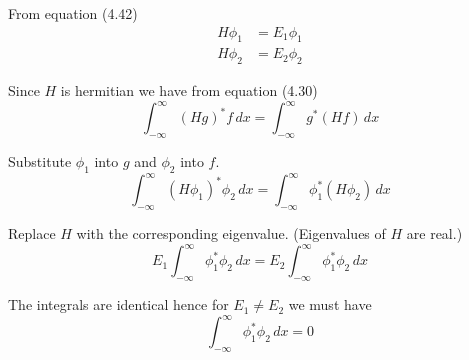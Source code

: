 


\bigskip
From equation (4.42)
\begin{align*}
H\phi_1&=E_1\phi_1
\\
H\phi_2&=E_2\phi_2
\end{align*}

Since $H$ is hermitian we have from equation (4.30)
\begin{equation*}
\int_{-\infty}^\infty(Hg)^*f\,dx=\int_{-\infty}^\infty g^*(Hf)\,dx
\tag{4.30}
\end{equation*}

Substitute $\phi_1$ into $g$ and $\phi_2$ into $f$.
\begin{equation*}
\int_{-\infty}^\infty(H\phi_1)^*\phi_2\,dx=\int_{-\infty}^\infty \phi_1^*(H\phi_2)\,dx
\end{equation*}

Replace $H$ with the corresponding eigenvalue.
(Eigenvalues of $H$ are real.)
\begin{equation*}
E_1\int_{-\infty}^\infty\phi_1^*\phi_2\,dx=E_2\int_{-\infty}^\infty \phi_1^*\phi_2\,dx
\end{equation*}

The integrals are identical hence for $E_1\ne E_2$ we must have
\begin{equation*}
\int_{-\infty}^\infty\phi_1^*\phi_2\,dx=0
\end{equation*}


